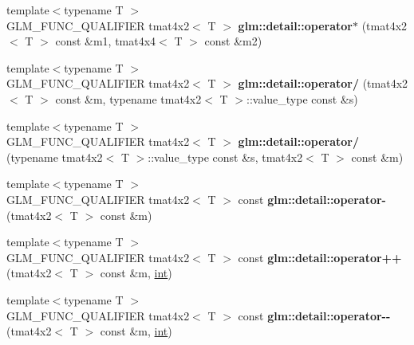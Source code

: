 \begin{DoxyCompactItemize}
\item 
\hypertarget{namespaceglm_1_1detail_a8717f8814d9b23544a066e0d6588bd2c}{}{\footnotesize template$<$typename T $>$ }\\G\+L\+M\+\_\+\+F\+U\+N\+C\+\_\+\+Q\+U\+A\+L\+I\+F\+I\+E\+R tmat4x2$<$ T $>$ {\bfseries glm\+::detail\+::operator$\ast$} (tmat4x2$<$ T $>$ const \&m1, tmat4x4$<$ T $>$ const \&m2)\label{namespaceglm_1_1detail_a8717f8814d9b23544a066e0d6588bd2c}

\item 
\hypertarget{namespaceglm_1_1detail_ab8546890defe7419e2826cadb3cef7da}{}{\footnotesize template$<$typename T $>$ }\\G\+L\+M\+\_\+\+F\+U\+N\+C\+\_\+\+Q\+U\+A\+L\+I\+F\+I\+E\+R tmat4x2$<$ T $>$ {\bfseries glm\+::detail\+::operator/} (tmat4x2$<$ T $>$ const \&m, typename tmat4x2$<$ T $>$\+::value\+\_\+type const \&s)\label{namespaceglm_1_1detail_ab8546890defe7419e2826cadb3cef7da}

\item 
\hypertarget{namespaceglm_1_1detail_a77d368b48cf81e1a16eb53d7263cee44}{}{\footnotesize template$<$typename T $>$ }\\G\+L\+M\+\_\+\+F\+U\+N\+C\+\_\+\+Q\+U\+A\+L\+I\+F\+I\+E\+R tmat4x2$<$ T $>$ {\bfseries glm\+::detail\+::operator/} (typename tmat4x2$<$ T $>$\+::value\+\_\+type const \&s, tmat4x2$<$ T $>$ const \&m)\label{namespaceglm_1_1detail_a77d368b48cf81e1a16eb53d7263cee44}

\item 
\hypertarget{namespaceglm_1_1detail_a414d6f053af536cae77ed43251069693}{}{\footnotesize template$<$typename T $>$ }\\G\+L\+M\+\_\+\+F\+U\+N\+C\+\_\+\+Q\+U\+A\+L\+I\+F\+I\+E\+R tmat4x2$<$ T $>$ const {\bfseries glm\+::detail\+::operator-\/} (tmat4x2$<$ T $>$ const \&m)\label{namespaceglm_1_1detail_a414d6f053af536cae77ed43251069693}

\item 
\hypertarget{namespaceglm_1_1detail_a1017c3c6c0c7707bd9ac01372d5b09bb}{}{\footnotesize template$<$typename T $>$ }\\G\+L\+M\+\_\+\+F\+U\+N\+C\+\_\+\+Q\+U\+A\+L\+I\+F\+I\+E\+R tmat4x2$<$ T $>$ const {\bfseries glm\+::detail\+::operator++} (tmat4x2$<$ T $>$ const \&m, \hyperlink{_s_d_l__thread_8h_a6a64f9be4433e4de6e2f2f548cf3c08e}{int})\label{namespaceglm_1_1detail_a1017c3c6c0c7707bd9ac01372d5b09bb}

\item 
\hypertarget{namespaceglm_1_1detail_a1df4b2e5549f849e01a4f20c30eddae9}{}{\footnotesize template$<$typename T $>$ }\\G\+L\+M\+\_\+\+F\+U\+N\+C\+\_\+\+Q\+U\+A\+L\+I\+F\+I\+E\+R tmat4x2$<$ T $>$ const {\bfseries glm\+::detail\+::operator-\/-\/} (tmat4x2$<$ T $>$ const \&m, \hyperlink{_s_d_l__thread_8h_a6a64f9be4433e4de6e2f2f548cf3c08e}{int})\label{namespaceglm_1_1detail_a1df4b2e5549f849e01a4f20c30eddae9}


\end{DoxyCompactItemize}
